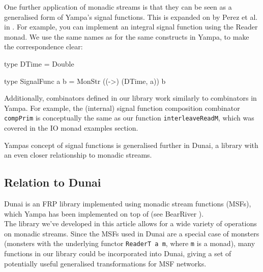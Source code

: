 \documentclass{article}
\begin{document}
One further application of monadic streams is that they can be seen as a generalised form of Yampa's \cite{yampa_arcade} signal functions. This is expanded on by Perez et al. in \cite{frp_refactored}. For example, you can implement an integral signal function using the Reader monad. We use the same names as for the same constructs in Yampa, to make the correspondence clear:

\begin{haskell}
type DTime = Double

type SignalFunc a b = MonStr ((->) (DTime, a)) b
\end{haskell}


Additionally, combinators defined in our library work similarly to combinators in Yampa. For example, the (internal) signal function composition combinator \verb+compPrim+ is conceptually the same as our function \verb+interleaveReadM+, which was covered in the IO monad examples section.

Yampas concept of signal functions is generalised further in Dunai, a library with an even closer relationship to monadic streams.

\subsection{Relation to Dunai}

Dunai \cite{frp_refactored}\cite{dunai} is an FRP library implemented using monadic stream functions (MSFs), which Yampa has been implemented on top of (see BearRiver \cite{bearriver}). \\

The library we've developed in this article allows for a wide variety of operations on monadic streams. Since the MSFs used in Dunai are a special case of monsters (monsters with the underlying functor \verb+ReaderT a m+, where \verb+m+ is a monad), many functions in our library could be incorporated into Dunai, giving a set of potentially useful generalised transformations for MSF networks. \\
\end{document}
